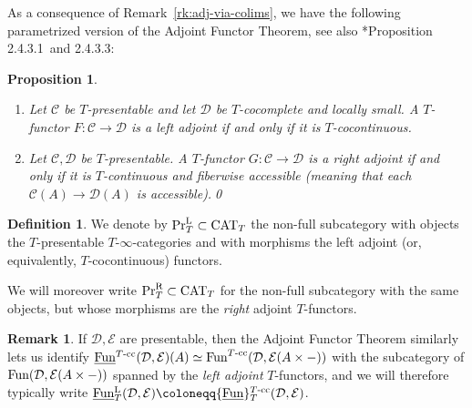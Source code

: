 \documentclass[reqno]{memo-l}
\theoremstyle{mythm}
\newtheorem{prop}[thm]{Proposition}
\theoremstyle{definition}
\newtheorem{rk}[thm]{Remark}
\newtheorem{definition}[thm]{Definition}
\numberwithin{equation}{section}
\newcommand{\Cc}{{\mathcal{C}}}
\newcommand{\Dd}{{\mathcal{D}}}
\newcommand{\Ee}{{\mathcal{E}}}
\DeclareMathOperator{\CAT}{CAT}
\newcommand{\PrLT}{\textup{Pr}^{\textup{L}}_{T}}
\newcommand{\PrRT}{\textup{Pr}^{\textup{R}}_{T}}
\newcommand{\Fun}{{\textup{Fun}}}
\newcommand{\ulhelper}[2]{\underline{\setbox0=\hbox{$#1#2$}\dp0=0.4pt \box0\relax}}
\newcommand{\ul}[1]{{\mathpalette\ulhelper{#1}}\hbox{\rule[-2pt]{0pt}{0pt}}}
\begin{document}
As a consequence of Remark~\ref{rk:adj-via-colims}, we have the following parametrized version of the Adjoint Functor Theorem, see also \cite{martiniwolf2022presentable}*{Proposition 2.4.3.1~and 2.4.3.3}:

\begin{prop}\label{prop:adj-functor-thm}
    \begin{enumerate}
        \item Let $\Cc$ be $T$-presentable and let $\Dd$ be $T$-cocomplete and locally small. A $T$-functor $F\colon\Cc\to\Dd$ is a left adjoint if and only if it is $T$-cocontinuous.
        \item Let $\Cc,\Dd$ be $T$-presentable. A $T$-functor $G\colon\Cc\to\Dd$ is a right adjoint if and only if it is $T$-continuous and fiberwise accessible (meaning that each $\Cc(A)\to\Dd(A)$ is accessible).\qedhere\qed
    \end{enumerate}
\end{prop}

\begin{definition}
    We denote by $\PrLT\subset\CAT_T$ the non-full subcategory with objects the $T$-presentable $T$-$\infty$-categories and with morphisms the left adjoint (or, equivalently, $T$-cocontinuous) functors. 

    We will moreover write $\PrRT\subset\CAT_T$ for the non-full subcategory with the same objects, but whose morphisms are the \emph{right} adjoint $T$-functors.
\end{definition}

\begin{rk}\label{rk:FunL}
    If $\Dd,\Ee$ are presentable, then the Adjoint Functor Theorem similarly lets us identify $\ul\Fun^\text{$T$-cc}(\Dd,\Ee)(A)\simeq\Fun^\text{$T$-cc}(\Dd,\Ee(A\times{-}))$ with the subcategory of $\Fun(\Dd,\Ee(A\times{-}))$ spanned by the \emph{left adjoint} $T$-functors, and we will therefore typically write $\ul\Fun_T^\text{L}(\Dd,\Ee)\coloneqq\ul\Fun_T^\text{$T$-cc}(\Dd,\Ee)$.
\end{rk}
\end{document}
